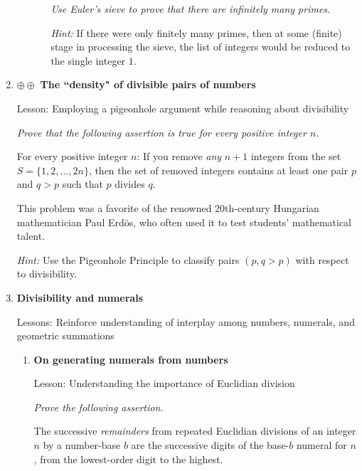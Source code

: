 \begin{enumerate}
\begin{enumerate}
\begin{enumerate}
\bigskip

{\em Use Euler's sieve to prove that there are infinitely many primes.}

\medskip

{\em Hint:} If there were only finitely many primes, then at some (finite) stage in processing the sieve, the list of integers would be reduced to the single integer $1$.
     \end{enumerate}
  \end{enumerate}

  \medskip\item
$\oplus \oplus$
{\bf The ``density"  of divisible pairs of numbers}

{\sc Lesson:} Employing a pigeonhole argument while reasoning about divisibility

\smallskip

{\em Prove that the following assertion is true for every positive integer $n$.}

\begin{prop}
For every positive integer $n$:  If you remove {\em any} $n+1$ integers from the set $S = \{ 1, 2, \ldots, 2n\}$, then the set of removed integers contains at least one pair $p$ and $q > p$ such that $p$ divides $q$.
\end{prop}


This problem was a favorite of the renowned 20th-century Hungarian mathematician Paul Erd\"{o}s, who often used it to test students' mathematical talent.

\smallskip

\textit{Hint:}
Use the Pigeonhole Principle to classify pairs $(p, q > p)$ with respect to divisibility.

\medskip\item
{\bf Divisibility and numerals}

{\sc Lessons:} Reinforce understanding of interplay among numbers, numerals, and geometric summations

   \begin{enumerate}
   \item
{\bf On generating numerals from numbers}

{\sc Lesson:} Understanding the importance of Euclidian division

\smallskip

{\em Prove the following assertion.}

\begin{prop}
The successive {\em remainders} from repeated Euclidian divisions of an integer $n$ by a number-base $b$ are the successive digits of the base-$b$ numeral for $n$, from the lowest-order digit to the highest.
\end{prop}


\end{enumerate}
\end{enumerate}
